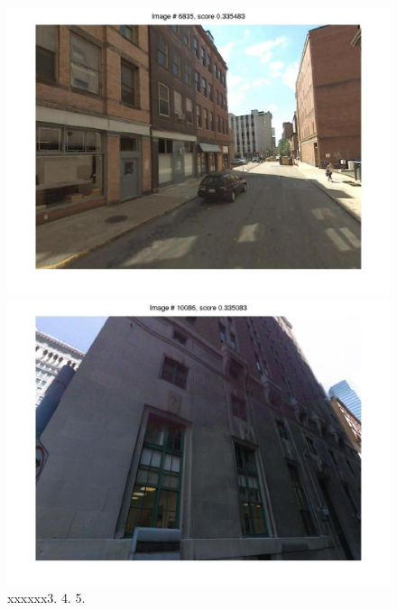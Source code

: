 \documentclass[10pt,onecolumn,A4]{article}
\begin{document}
\begin{figure}
\begin{minipage}{0.45\linewidth}
		\colorbox{myCopper4}{\includegraphics[trim = 55mm 40mm 55mm 30mm, clip=true,width=0.30\linewidth]{sup1812/svm04.jpg}}
		\colorbox{myCopper5}{\includegraphics[trim = 55mm 40mm 55mm 30mm, clip=true,width=0.30\linewidth]{sup1812/svm05.jpg}}  \\
		\textcolor{myWhite}{xxxxxx}3. \hspace{0.25\linewidth}4. \hspace{0.25\linewidth}5. \\
	\end{minipage}
\end{figure}
\end{document}
